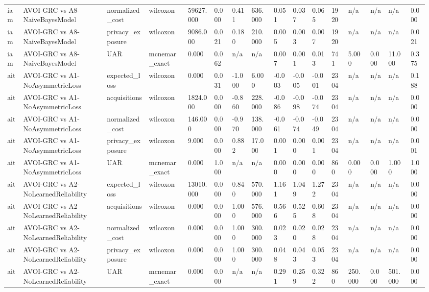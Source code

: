 \begin{table}[!ht]
{\begin{tabular}{llllllllllllllll}
iam & AVOI-GRC vs A8-NaiveBayesModel & normalized\_cost & wilcoxon & 59627.000 & 0.000 & 0.411 & 636.000 & 0.051 & 0.037 & 0.065 & 1920 & n/a & n/a & n/a & 0.000 \\
iam & AVOI-GRC vs A8-NaiveBayesModel & privacy\_exposure & wilcoxon & 9086.000 & 0.021 & 0.180 & 210.000 & 0.005 & 0.003 & 0.007 & 1920 & n/a & n/a & n/a & 0.021 \\
iam & AVOI-GRC vs A8-NaiveBayesModel & UAR & mcnemar\_exact & 0.000 & 0.062 & n/a & n/a & 0.007 & 0.001 & 0.013 & 741 & 5.000 & 0.000 & 11.000 & 0.375 \\
ait & AVOI-GRC vs A1-NoAsymmetricLoss & expected\_loss & wilcoxon & 0.000 & 0.031 & -1.000 & 6.000 & -0.003 & -0.005 & -0.001 & 2304 & n/a & n/a & n/a & 0.188 \\
ait & AVOI-GRC vs A1-NoAsymmetricLoss & acquisitions & wilcoxon & 1824.000 & 0.000 & -0.860 & 228.000 & -0.086 & -0.098 & -0.074 & 2304 & n/a & n/a & n/a & 0.000 \\
ait & AVOI-GRC vs A1-NoAsymmetricLoss & normalized\_cost & wilcoxon & 146.000 & 0.000 & -0.970 & 138.000 & -0.061 & -0.074 & -0.049 & 2304 & n/a & n/a & n/a & 0.000 \\
ait & AVOI-GRC vs A1-NoAsymmetricLoss & privacy\_exposure & wilcoxon & 9.000 & 0.000 & 0.882 & 17.000 & 0.001 & 0.000 & 0.001 & 2304 & n/a & n/a & n/a & 0.001 \\
ait & AVOI-GRC vs A1-NoAsymmetricLoss & UAR & mcnemar\_exact & 0.000 & 1.000 & n/a & n/a & 0.000 & 0.000 & 0.000 & 860 & 0.000 & 0.000 & 1.000 & 1.000 \\
ait & AVOI-GRC vs A2-NoLearnedReliability & expected\_loss & wilcoxon & 13010.000 & 0.000 & 0.840 & 570.000 & 1.161 & 1.049 & 1.272 & 2304 & n/a & n/a & n/a & 0.000 \\
ait & AVOI-GRC vs A2-NoLearnedReliability & acquisitions & wilcoxon & 0.000 & 0.000 & 1.000 & 576.000 & 0.566 & 0.525 & 0.608 & 2304 & n/a & n/a & n/a & 0.000 \\
ait & AVOI-GRC vs A2-NoLearnedReliability & normalized\_cost & wilcoxon & 0.000 & 0.000 & 1.000 & 300.000 & 0.023 & 0.020 & 0.028 & 2304 & n/a & n/a & n/a & 0.000 \\
ait & AVOI-GRC vs A2-NoLearnedReliability & privacy\_exposure & wilcoxon & 0.000 & 0.000 & 1.000 & 300.000 & 0.048 & 0.043 & 0.053 & 2304 & n/a & n/a & n/a & 0.000 \\
ait & AVOI-GRC vs A2-NoLearnedReliability & UAR & mcnemar\_exact & 0.000 & 0.000 & n/a & n/a & 0.291 & 0.259 & 0.322 & 860 & 250.000 & 0.000 & 501.000 & 0.000 \\

\end{tabular}}
\end{table}
